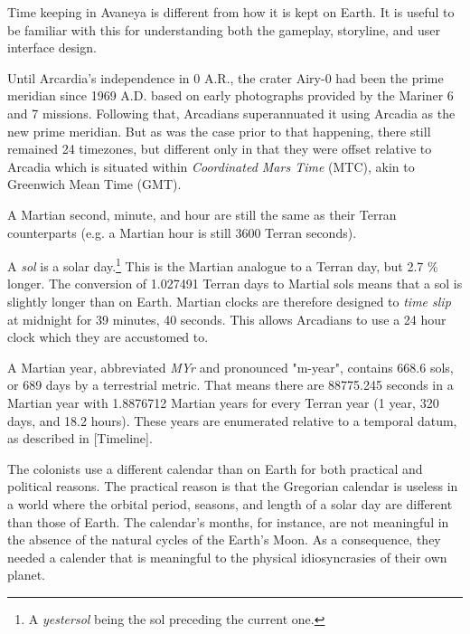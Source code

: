 

Time keeping in Avaneya is different from how it is kept on Earth. It is useful to be familiar with this for understanding both the gameplay, storyline, and user interface design.


Until Arcardia's independence in 0 A.R., the crater Airy-0 had been the prime meridian since 1969 A.D. based on early photographs provided by the Mariner 6 and 7 missions. Following that, Arcadians superannuated it using Arcadia as the new prime meridian. But as was the case prior to that happening, there still remained 24 timezones, but different only in that they were offset relative to Arcadia which is situated within {\it Coordinated Mars Time} (MTC), akin to Greenwich Mean Time (GMT).

A Martian second, minute, and hour are still the same as their Terran counterparts (e.g. a Martian hour is still 3600 Terran seconds).

A {\it sol} is a solar day.\footnote{A {\it yestersol} being the sol preceding the current one.} This is the Martian analogue to a Terran day, but 2.7 \% longer. The conversion of 1.027491 Terran days to Martial sols means that a sol is slightly longer than on Earth. Martian clocks are therefore designed to {\it time slip} at midnight for 39 minutes, 40 seconds. This allows Arcadians to use a 24 hour clock which they are accustomed to.

A Martian year, abbreviated {\it MYr} and pronounced "m-year", contains 668.6 sols, or 689 days by a terrestrial metric. That means there are 88775.245 seconds in a Martian year with 1.8876712 Martian years for every Terran year (1 year, 320 days, and 18.2 hours). These years are enumerated relative to a temporal datum, as described in [Timeline].


The colonists use a different calendar than on Earth for both practical and political reasons. The practical reason is that the Gregorian calendar is useless in a world where the orbital period, seasons, and length of a solar day are different than those of Earth. The calendar's months, for instance, are not meaningful in the absence of the natural cycles of the Earth's Moon. As a consequence, they needed a calender that is meaningful to the physical idiosyncrasies of their own planet.

